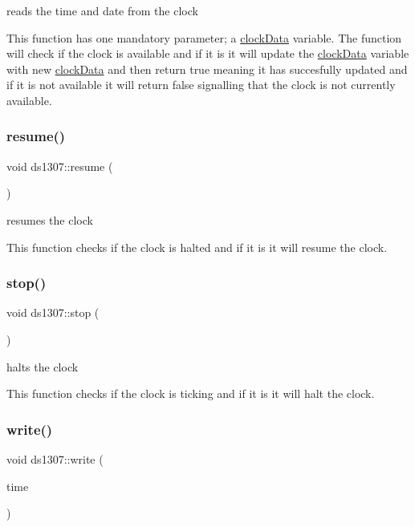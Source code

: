 reads the time and date from the clock 

This function has one mandatory parameter; a \hyperlink{structclockData}{clock\+Data} variable. The function will check if the clock is available and if it is it will update the \hyperlink{structclockData}{clock\+Data} variable with new \hyperlink{structclockData}{clock\+Data} and then return true meaning it has succesfully updated and if it is not available it will return false signalling that the clock is not currently available. \mbox{\label{classds1307_a4a3381031893e29473b07298b7e453a1}} 
\subsubsection{\texorpdfstring{resume()}{resume()}}
{\footnotesize\ttfamily void ds1307\+::resume (\begin{DoxyParamCaption}{ }\end{DoxyParamCaption})\hspace{0.3cm}{\ttfamily [inline]}}



resumes the clock 

This function checks if the clock is halted and if it is it will resume the clock. \mbox{\label{classds1307_a1a907663046341c0b4ec1fea2f4e4eb8}} 
\subsubsection{\texorpdfstring{stop()}{stop()}}
{\footnotesize\ttfamily void ds1307\+::stop (\begin{DoxyParamCaption}{ }\end{DoxyParamCaption})\hspace{0.3cm}{\ttfamily [inline]}}



halts the clock 

This function checks if the clock is ticking and if it is it will halt the clock. \mbox{\label{classds1307_a8f4da237ebd8ac608e0eabc8e005cac8}} 
\subsubsection{\texorpdfstring{write()}{write()}}
{\footnotesize\ttfamily void ds1307\+::write (\begin{DoxyParamCaption}\item[{const \hyperlink{structclockData}{clock\+Data}}]{time }\end{DoxyParamCaption})\hspace{0.3cm}{\ttfamily [inline]}}



